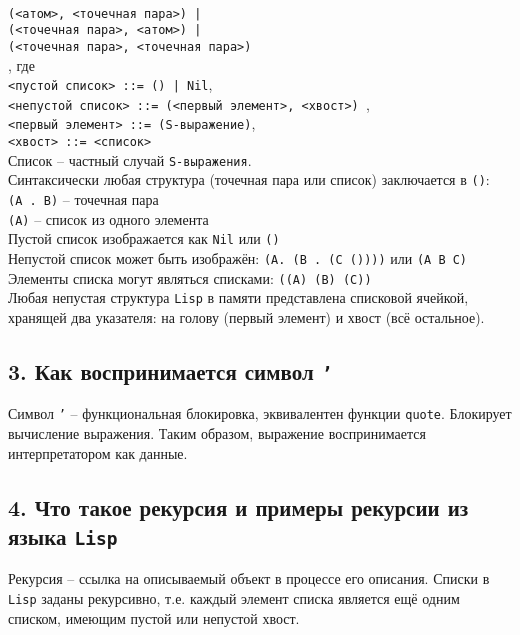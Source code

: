 \\
{\texttt{(<атом>, <точечная пара>) |}}\\
{\texttt{(<точечная пара>, <атом>) |}}\\
{\texttt{(<точечная пара>, <точечная пара>)}}\\

, где\\
{\texttt{<пустой список> ::= () | Nil}},\\
{\texttt{<непустой список> ::= (<первый элемент>, <хвост>) }},\\
{\texttt{<первый элемент> ::= (S-выражение)}},\\
{\texttt{<хвост> ::= <список>}}\\

\noindent Список -- частный случай {\texttt{S-выражения}}.\\
Синтаксически любая структура (точечная пара или список) заключается в {\texttt{()}}:\\
{\texttt{(A . B)}} -- точечная пара\\
{\texttt{(A)}} -- список из одного элемента\\
Пустой список изображается как {\texttt{Nil}} или {\texttt{()}}\\
Непустой список может быть изображён: {\texttt{(A. (B . (C ())))}} или {\texttt{(A B C)}}\\
Элементы списка могут являться списками: {\texttt{((A) (B) (C))}}\\
Любая непустая структура {\texttt{Lisp}} в памяти представлена списковой ячейкой, хранящей два указателя: на голову (первый элемент) и хвост (всё остальное).

\subsection*{3. Как воспринимается символ {\texttt{'}}}

Символ {\texttt{'}} -- функциональная блокировка, эквивалентен функции {\texttt{quote}}. Блокирует вычисление выражения. Таким образом, выражение воспринимается интерпретатором как данные.

\subsection*{4. Что такое рекурсия и примеры рекурсии из языка {\texttt{Lisp}}}

Рекурсия -- ссылка на описываемый объект в процессе его описания. Списки в {\texttt{Lisp}} заданы рекурсивно, т.е. каждый элемент списка является ещё одним списком, имеющим пустой или непустой хвост.